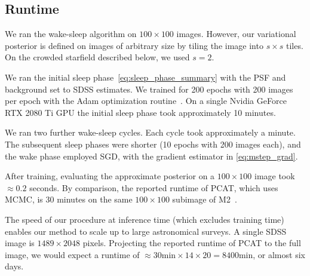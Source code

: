 \subsection{Runtime} 
\label{sec:runtime}
We ran the wake-sleep algorithm on $100 \times 100$ images. 
However, our variational posterior is defined on images of arbitrary size
by tiling the image into $s \times s$ tiles. On the crowded starfield described below, we used $s = 2$. 

We ran the initial sleep phase~\eqref{eq:sleep_phase_summary}
with the PSF and background set to SDSS estimates. We trained for 200 epochs with 200 images per epoch with  
the Adam optimization routine~\cite{kingma2014adam}. 
On a single Nvidia GeForce RTX 2080 Ti GPU 
the initial sleep phase took approximately 10 minutes. 

We ran two further wake-sleep cycles. Each cycle took approximately a minute. The subsequent sleep phases were shorter (10 epochs with 200 images each), and the wake phase employed SGD, with the gradient estimator in \eqref{eq:mstep_grad}. 

After training, evaluating the approximate posterior on a $100 \times 100$ 
image took $\approx 0.2$ seconds. By comparison, the reported runtime of PCAT, which uses MCMC, is 30 minutes on the same $100 \times 100$ subimage of M2~\cite{Feder_2019}. 

The speed of our procedure at inference time (which excludes training time) enables our method to scale up to large astronomical surveys. A single SDSS image is $1489 \times 2048$ pixels. Projecting the reported runtime of PCAT to the full image, 
we would expect a runtime of 
$\approx 30\text{min} \times 14 \times 20 = 8400$min, or almost six days.

